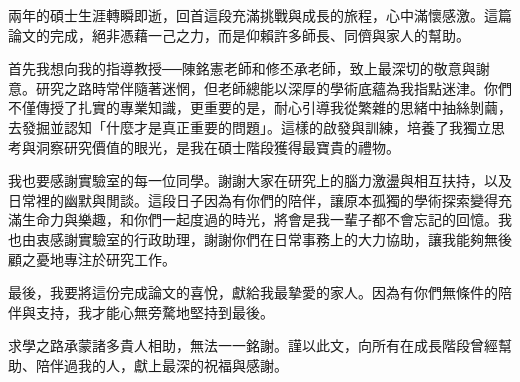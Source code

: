 \begin{acknowledgement}
兩年的碩士生涯轉瞬即逝，回首這段充滿挑戰與成長的旅程，心中滿懷感激。這篇論文的完成，絕非憑藉一己之力，而是仰賴許多師長、同儕與家人的幫助。

首先我想向我的指導教授──陳銘憲老師和修丕承老師，致上最深切的敬意與謝意。研究之路時常伴隨著迷惘，但老師總能以深厚的學術底蘊為我指點迷津。你們不僅傳授了扎實的專業知識，更重要的是，耐心引導我從繁雜的思緒中抽絲剝繭，去發掘並認知「什麼才是真正重要的問題」。這樣的啟發與訓練，培養了我獨立思考與洞察研究價值的眼光，是我在碩士階段獲得最寶貴的禮物。

我也要感謝實驗室的每一位同學。謝謝大家在研究上的腦力激盪與相互扶持，以及日常裡的幽默與閒談。這段日子因為有你們的陪伴，讓原本孤獨的學術探索變得充滿生命力與樂趣，和你們一起度過的時光，將會是我一輩子都不會忘記的回憶。我也由衷感謝實驗室的行政助理，謝謝你們在日常事務上的大力協助，讓我能夠無後顧之憂地專注於研究工作。

最後，我要將這份完成論文的喜悅，獻給我最摯愛的家人。因為有你們無條件的陪伴與支持，我才能心無旁騖地堅持到最後。

求學之路承蒙諸多貴人相助，無法一一銘謝。謹以此文，向所有在成長階段曾經幫助、陪伴過我的人，獻上最深的祝福與感謝。
\end{acknowledgement}